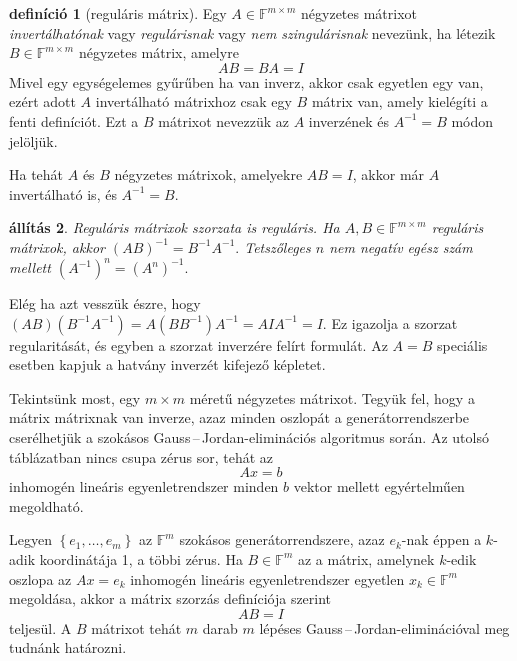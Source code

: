 \documentclass[a4paper, showtrims]{memoir}
\makeatletter
\renewenvironment{proof}[1][\proofname]
    {\par\pushQED{\qed}%
    \normalfont \topsep6\p@\@plus6\p@\relax
    \trivlist
    \item[\hskip\labelsep
        \itshape
    #1\@addpunct{:}]\ignorespaces}
    {\popQED\endtrivlist\@endpefalse}
\theoremstyle{plain}
\newtheorem{proposition}{állítás}[chapter]
\theoremstyle{remark}
\theoremstyle{definition}
\newtheorem{definition}[proposition]{definíció}
\makeatother
\begin{document}
\begin{definition}[reguláris mátrix]
	Egy $A\in\mathbb{F}^{m\times m}$ négyzetes mátrixot
	\emph{invertálhatónak} vagy
	\emph{regulárisnak} vagy \emph{nem szingulárisnak} nevezünk,
	ha létezik $B\in\mathbb{F}^{m\times m}$ négyzetes mátrix,
	amelyre
	\[
		AB=BA=I
	\]
	Mivel egy egységelemes gyűrűben ha van inverz, akkor csak egyetlen egy van,
	ezért adott $A$ invertálható mátrixhoz csak egy $B$ mátrix van, amely kielégíti a fenti definíciót.
	Ezt a $B$ mátrixot nevezzük az $A$ inverzének és $A^{-1}=B$ módon jelöljük.
\end{definition}

Ha tehát $A$ és $B$ négyzetes mátrixok, amelyekre $AB=I$,
akkor már $A$ invertálható is, és $A^{-1}=B$. 
\begin{proposition}
    Reguláris mátrixok szorzata is reguláris.
    Ha $A,B\in\mathbb{F}^{m\times m}$ reguláris mátrixok, akkor
    \(
    \left( AB \right)^{-1}=B^{-1}A^{-1}.
    \)
    Tetszőleges $n$ nem negatív egész szám mellett 
    \(
    \left( A^{-1} \right)^{n}
    =
    \left( A^{n} \right)^{-1}.
    \)
\end{proposition}
\begin{proof}
    Elég ha azt vesszük észre, hogy
    \(
        \left( AB \right)\left( B^{-1}A^{-1} \right)
        =
        A\left( BB^{-1} \right)A^{-1}
        =
        AIA^{-1}
        =
        I.
    \)
    Ez igazolja a szorzat regularitását, és egyben a szorzat inverzére felírt formulát.
    Az $A=B$ speciális esetben kapjuk a hatvány inverzét kifejező képletet.
\end{proof}

Tekintsünk most, egy $m\times m$ méretű négyzetes mátrixot.
Tegyük fel, hogy a mátrix mátrixnak van inverze,
azaz minden oszlopát a generátorrendszerbe cserélhetjük a szokásos Gauss\,--\,Jordan-eliminációs algoritmus során.
Az utolsó táblázatban nincs csupa zérus sor, tehát az 
$$Ax=b$$ inhomogén lineáris egyenletrendszer
minden $b$ vektor mellett egyértelműen megoldható.

Legyen $\left\{ e_1,\ldots,e_m \right\}$ az $\mathbb{F}^m$ szokásos generátorrendszere,
azaz $e_k$-nak éppen a $k$-adik koordinátája 1, a többi zérus.
Ha $B\in\mathbb{F}^m$ az a mátrix,
amelynek $k$-edik oszlopa az $Ax=e_k$ inhomogén lineáris egyenletrendszer egyetlen $x_k\in\mathbb{F}^m$ megoldása,
akkor a mátrix szorzás definíciója szerint
\[
	AB=I
\]
teljesül.
A $B$ mátrixot tehát $m$ darab $m$ lépéses Gauss\,--\,Jordan-eliminációval  meg tudnánk határozni.
\end{document}
